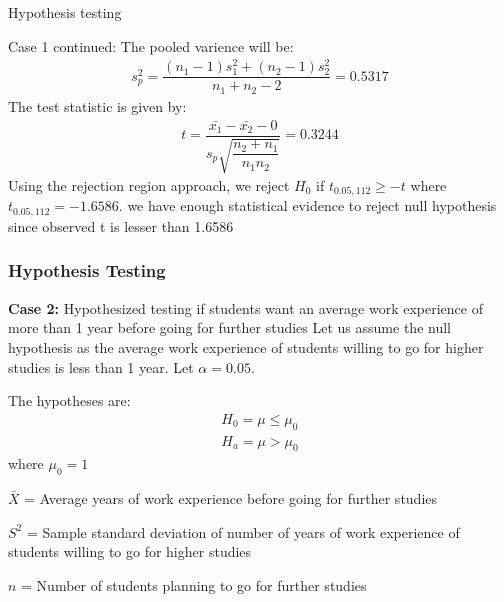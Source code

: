\documentclass{beamer}
\begin{document}
    \begin{frame}{Hypothesis testing}
    \begin{block}{Case 1 continued:}
        The pooled varience will be:
           \begin{align}
               s^2_p=\dfrac{(n_1-1)s^2_1+(n_2-1)s^2_2}{n_1+n_2-2}=0.5317
           \end{align}
           The test statistic is given by:
           \begin{align}
               t=\dfrac{\bar{x_1}-\bar{x_2}-0}{s_p\sqrt{\dfrac{n_2+n_1}{n_1n_2}}}=0.3244
           \end{align}
           Using the rejection region approach, we reject $H_0$ if $t_{0.05,112}\geq -t$ where $t_{0.05,112}=-1.6586$. we have enough statistical evidence to reject null hypothesis since observed t is lesser than 1.6586
           
    \end{block}
        
    \end{frame}

\begin{frame}
  \frametitle{Hypothesis Testing}
  \begin{block}{\textbf{Case 2:}{ Hypothesized testing if students want an average work experience of more than 1 year before going for further studies }}
     Let us assume the null hypothesis as the average work experience of students willing to go for higher studies is  less than 1 year. Let $\alpha = 0.05$.

     The hypotheses are:
      \begin{align*}
          H_0=\mu\leq \mu_0\\
          H_a=\mu > \mu_0
      \end{align*}
      where $\mu_0 = 1$

     \begin{enumerate*}
         \item  $\bar{X}$ = Average years of work experience before going for further studies\\
         \item  $S^2$ = Sample standard deviation of number of years of work experience of students willing to go for higher studies\\
         \item $n$ = Number of students planning to go for further studies\\
     \end{enumerate*}
        \end{block}
    \end{frame}
\end{document}
